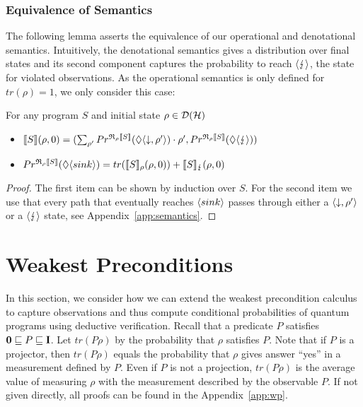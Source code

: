 \documentclass[a4paper,UKenglish,cleveref, autoref, thm-restate]{lipics-v2021}
\begin{document}
\subsubsection{Equivalence of Semantics}
The following lemma asserts the equivalence of our operational and denotational semantics. Intuitively, the denotational semantics gives a distribution over final states and its second component captures the probability to reach $\langle \lightning \rangle$, the state for violated observations. As the operational semantics is only defined for $tr(\rho) = 1$, we only consider this case:
\begin{lemma}
    \label{lem:operationalVsDenotational}
    For any program $S$ and initial state $\rho \in \mathcal{D}(\mathcal{H})$
    \begin{itemize}
        \item $\llbracket S \rrbracket(\rho,0) = (\sum_{\rho'} Pr^{\mathfrak{R}_{\rho}\llbracket S \rrbracket}(\lozenge \langle \downarrow , \rho' \rangle) \cdot \rho',Pr^{\mathfrak{R}_{\rho}\llbracket S \rrbracket}(\lozenge \langle \lightning \rangle))$
        \item $Pr^{\mathfrak{R}_{\rho}\llbracket S \rrbracket}(\lozenge \langle sink \rangle) = tr(\llbracket S \rrbracket_{\rho}(\rho,0))+\llbracket S \rrbracket_{\lightning}(\rho,0)$
    \end{itemize}
\end{lemma}
\begin{proof}
    The first item can be shown by induction over $S$. For the second item we use that every path that eventually reaches $\langle sink \rangle$ passes through either a $\langle \downarrow , \rho' \rangle$ or a $\langle \lightning \rangle$ state, see Appendix~\ref{app:semantics}.
\end{proof} \section{Weakest Preconditions}
\label{sec:wp}

In this section, we consider how we can extend the weakest precondition calculus to capture observations and thus compute conditional probabilities of quantum programs using deductive verification. Recall that a predicate $P$ satisfies $\mathbf{0} \sqsubseteq P \sqsubseteq \textbf{I}$. Let $tr(P\rho)$ by the probability that $\rho$ satisfies $P$. Note that if $P$ is a projector, then $tr(P\rho)$ equals the probability that $\rho$ gives answer ``yes'' in a measurement defined by $P$. Even if $P$ is not a projection, $tr(P\rho)$ is the average value of measuring $\rho$ with the measurement described by the observable $P$. If not given directly, all proofs can be found in the Appendix~\ref{app:wp}.
\end{document}
